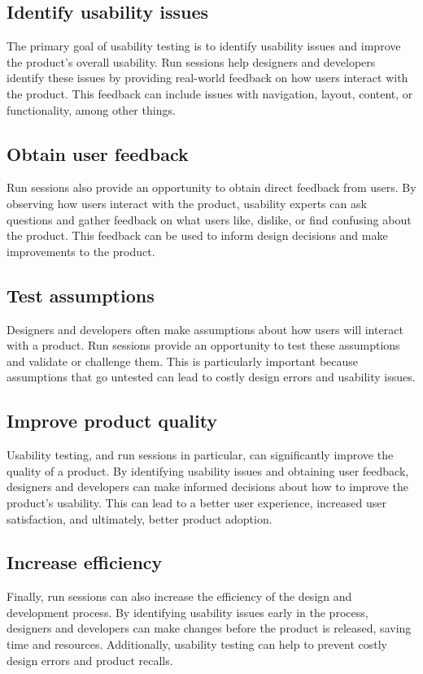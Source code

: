 \subsection{Identify usability issues}
The primary goal of usability testing is to identify usability issues and improve the product's overall usability. 
Run sessions help designers and developers identify these issues by providing real-world feedback on how users interact 
with the product. This feedback can include issues with navigation, layout, content, or functionality, among other things.

\subsection{Obtain user feedback}
Run sessions also provide an opportunity to obtain direct feedback from users. By observing how users interact 
with the product, usability experts can ask questions and gather feedback on what users like, dislike, or find 
confusing about the product. This feedback can be used to inform design decisions and make improvements to the product.

\subsection{Test assumptions}
Designers and developers often make assumptions about how users will interact with a product. Run sessions 
provide an opportunity to test these assumptions and validate or challenge them. This is particularly important 
because assumptions that go untested can lead to costly design errors and usability issues.

\subsection{Improve product quality}
Usability testing, and run sessions in particular, can significantly improve the quality of a product. 
By identifying usability issues and obtaining user feedback, designers and developers can make informed 
decisions about how to improve the product's usability. This can lead to a better user experience, 
increased user satisfaction, and ultimately, better product adoption.

\subsection{Increase efficiency}
Finally, run sessions can also increase the efficiency of the design and development process. 
By identifying usability issues early in the process, designers and developers can make changes 
before the product is released, saving time and resources. Additionally, usability testing can 
help to prevent costly design errors and product recalls.


